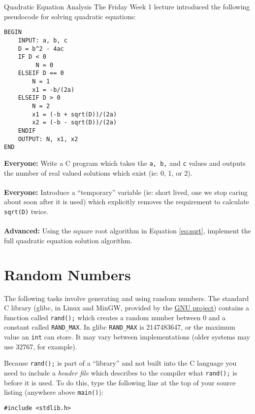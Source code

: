 \documentclass{lab}
\begin{document}
\begin{task}{Quadratic Equation Analysis}{}
The Friday Week 1 lecture introduced the following pseudocode for solving quadratic equations:
\begin{lstlisting}[style=pseudo]
BEGIN
	INPUT: a, b, c
	D = b^2 - 4ac
	IF D < 0
		 N = 0
	ELSEIF D == 0
		N = 1
		x1 = -b/(2a)
	ELSEIF D > 0
		N = 2
		x1 = (-b + sqrt(D))/(2a)
		x2 = (-b - sqrt(D))/(2a)
	ENDIF
	OUTPUT: N, x1, x2
END
\end{lstlisting}

\textbf{Everyone:} Write a C program which takes the \texttt{a, b,} and \texttt{c} values and outputs the number of real valued solutions which exist (ie: 0, 1, or 2).
\\ \\
\textbf{Everyone:} Introduce a ``temporary'' variable (ie: short lived, one we stop caring about soon after it is used) which explicitly removes the requirement to calculate \texttt{sqrt(D)} twice.
\\ \\
\textbf{Advanced:} Using the square root algorithm in Equation \ref{eq:sqrt}, implement the full quadratic equation solution algorithm.
\end{task}

\pagebreak
\section{Random Numbers}

The following tasks involve generating and using random numbers. The standard C library (glibc, in Linux and MinGW, provided by the \underline{\href{https://en.wikipedia.org/wiki/GNU_Project}{GNU project}}) contains a function called \texttt{rand();} which creates a random number between 0 and a constant called \texttt{RAND\_MAX}. In glibc \texttt{RAND\_MAX} is 2147483647, or the maximum value an \texttt{int} can store. It may vary between implementations (older systems may use 32767, for example).

Because \texttt{rand();} is part of a ``library'' and not built into the C language you need to include a \textit{header file} which describes to the compiler what \texttt{rand();} is before it is used. To do this, type the following line at the top of your source listing (anywhere above \texttt{main()}):

\begin{lstlisting}[style=CStyle]
#include <stdlib.h>
\end{lstlisting}
\end{document}

